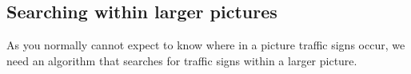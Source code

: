 \documentclass[11pt]{article}
\begin{document}
    \begin{center}
    \end{center}
    { \hspace*{\fill} \\}
    
    \begin{center}
    \end{center}
    { \hspace*{\fill} \\}
    
    \begin{center}
    \end{center}
    { \hspace*{\fill} \\}
    
    \begin{center}
    \end{center}
    { \hspace*{\fill} \\}
    
    \begin{center}
    \end{center}
    { \hspace*{\fill} \\}
    
    \subsection{Searching within larger
pictures}\label{searching-within-larger-pictures}

    As you normally cannot expect to know where in a picture traffic signs
occur, we need an algorithm that searches for traffic signs within a
larger picture.
\end{document}
